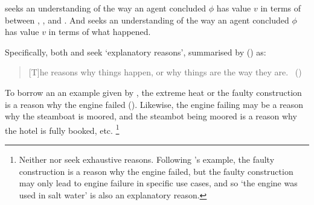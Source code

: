 \begin{note}
  \qWhy{} seeks an understanding of the way an agent concluded \(\phi\) has value \(v\) in terms of \ros{} between , , and .
  And \qHow{} seeks an understanding of the way an agent concluded \(\phi\) has value \(v\) in terms of what happened.

  Specifically, both \qWhy{} and \qHow{} seek `explanatory reasons', summarised by \citeauthor{Hieronymi:2011aa} (\citeyear{Hieronymi:2011aa}) as:
  \begin{quote}
    [T]he reasons why things happen, or why things are the way they are.\newline
    \mbox{ }\hfill\mbox{(\citeyear[410]{Hieronymi:2011aa})}
  \end{quote}
  To borrow an an example given by \citeauthor{Hieronymi:2011aa}, the extreme heat or the faulty construction is a reason why the engine failed (\citeyear[409]{Hieronymi:2011aa}).
  Likewise, the engine failing may be a reason why the steamboat is moored, and the steambot being moored is a reason why the hotel is fully booked, etc.%
  \footnote{
    Neither \qWhy{} nor \qHow{} seek exhaustive reasons.
    Following \citeauthor{Hieronymi:2011aa}'s example, the faulty construction is a reason why the engine failed, but the faulty construction may only lead to engine failure in specific use cases, and so `the engine was used in salt water' is also an explanatory reason.
  }
\end{note}

